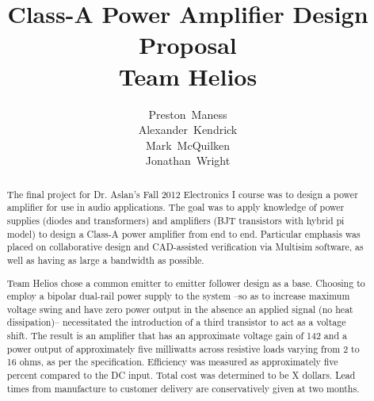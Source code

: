 \documentclass[journal]{IEEEtran}
\begin{document}
\title{Class-A Power Amplifier Design Proposal\\Team Helios}
\author{Preston~Maness\\Alexander~Kendrick\\Mark~McQuilken\\Jonathan~Wright}

%
{}

\maketitle

\begin{abstract}
The final project for Dr. Aslan's Fall 2012 Electronics I course was to design a power amplifier for use in audio applications. The goal was to apply knowledge of power supplies (diodes and transformers) and amplifiers (BJT transistors with hybrid pi model) to design a Class-A power amplifier from end to end. Particular emphasis was placed on collaborative design and CAD-assisted verification via Multisim software, as well as having as large a bandwidth as possible. 

Team Helios chose a common emitter to emitter follower design as a base. Choosing to employ a bipolar dual-rail power supply to the system --so as to increase maximum voltage swing and have zero power output in the absence an applied signal (no heat dissipation)-- necessitated the introduction of a third transistor to act as a voltage shift. The result is an amplifier that has an approximate voltage gain of 142 and a power output of approximately five milliwatts across resistive loads varying from 2 to 16 ohms, as per the specification. Efficiency was measured as approximately five percent compared to the DC input. Total cost was determined to be X dollars. Lead times from manufacture to customer delivery are conservatively given at two months.
\end{abstract}

\tableofcontents
\listoffigures

\end{document}
